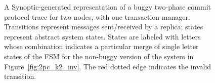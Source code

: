 \begin{figure}[!t]
  \caption{A Synoptic-generated representation of a buggy two-phase
    commit protocol trace for two nodes, with one transaction
    manager. Transitions represent messages sent/received by a
    replica; states represent abstract system states. States are
    labeled with letters whose combination indicates a particular
    merge of single letter states of the FSM for the non-buggy version
    of the system in Figure~\ref{fig:2pc_k2_inv}. The red dotted edge
    indicates the invalid transition.}
  \label{fig:2pc_k2_inv_bug}
\end{figure}

